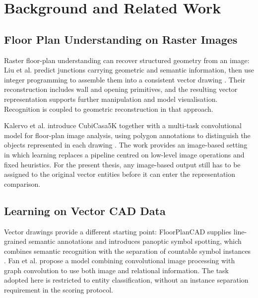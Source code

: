 \chapter{Background and Related Work}
\label{ch:background}

\section{Floor Plan Understanding on Raster Images}
\label{sec:raster-floor-plans}
Raster floor-plan understanding can recover structured geometry from an image:
Liu et al. predict junctions carrying geometric and semantic information, then
use integer programming to assemble them into a consistent vector drawing
\cite{Liu2017RasterToVector}.
Their reconstruction includes wall and opening primitives, and the resulting
vector representation supports further manipulation and model visualisation.
Recognition is coupled to geometric reconstruction in that approach.

Kalervo et al. introduce CubiCasa5K together with a multi-task convolutional model
for floor-plan image analysis, using polygon annotations to distinguish the
objects represented in each drawing \cite{Kalervo2019CubiCasa}.
The work provides an image-based setting in which learning replaces a pipeline
centred on low-level image operations and fixed heuristics.
For the present thesis, any image-based output still has to be assigned to the
original vector entities before it can enter the representation comparison.

\section{Learning on Vector CAD Data}
\label{sec:vector-cad-learning}
Vector drawings provide a different starting point: FloorPlanCAD supplies
line-grained semantic annotations and introduces panoptic symbol spotting, which
combines semantic recognition with the separation of countable symbol instances
\cite{Fan2021FloorPlanCAD}.
Fan et al. propose a model combining convolutional image processing with graph
convolution to use both image and relational information.
The task adopted here is restricted to entity classification, without an instance
separation requirement in the scoring protocol.

